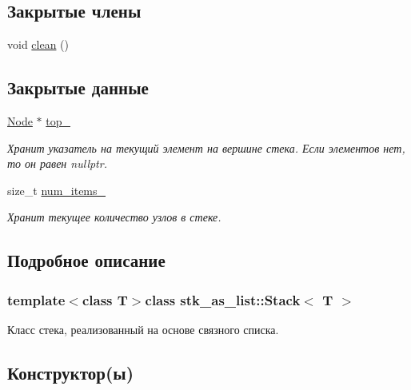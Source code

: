 \subsection*{Закрытые члены}
\begin{DoxyCompactItemize}
\item 
void \hyperlink{classstk__as__list_1_1_stack_ad96efdeb39952c4914d4e9eb578936c4}{clean} ()
\end{DoxyCompactItemize}
\subsection*{Закрытые данные}
\begin{DoxyCompactItemize}
\item 
\hyperlink{structstk__as__list_1_1_stack_1_1_node}{Node} $\ast$ \hyperlink{classstk__as__list_1_1_stack_a9d4ea95bc7425e321ee82a2e9a05a6b2}{top\+\_\+}
\begin{DoxyCompactList}\small\item\em Хранит указатель на текущий элемент на вершине стека. Если элементов нет, то он равен nullptr. \end{DoxyCompactList}\item 
size\+\_\+t \hyperlink{classstk__as__list_1_1_stack_aa19d82f1efcce9c75207b8036b9ba9eb}{num\+\_\+items\+\_\+}
\begin{DoxyCompactList}\small\item\em Хранит текущее количество узлов в стеке. \end{DoxyCompactList}\end{DoxyCompactItemize}


\subsection{Подробное описание}
\subsubsection*{template$<$class T$>$class stk\+\_\+as\+\_\+list\+::\+Stack$<$ T $>$}

Класс стека, реализованный на основе связного списка. 

\subsection{Конструктор(ы)}
\hypertarget{classstk__as__list_1_1_stack_a14cd1cba325bead4ff0a91bc6eb0f6f5}{}
